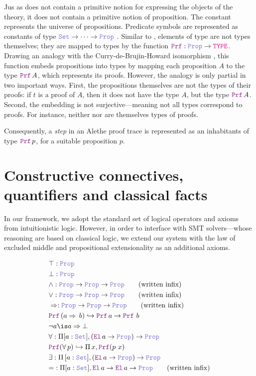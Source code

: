 Jus as \lpm{} does not contain a primitive notion for expressing the objects of the theory, it does not contain a primitive notion of proposition.
The constant \prop{} represents the universe of propositions. Predicate symbols are represented as constants of type $\set{} \ra \dots \ra \prop$ .
Similar to \set{}, elements of type \prop{} are not types themselves; they are mapped to types by the function $\prf{}: \prop \rightarrow \type$.
Drawing an analogy with the Curry-de-Brujin-Howard isomorphism \cite{curryhoward}, this function embeds propositions into types by mapping each proposition $A$ to the type $\prf\,A$, which represents its proofs.
However, the analogy is only partial in two important ways. First, the propositions themselves are not the types of their proofs: if $t$ is a proof of $A$, then it does not have the type $A$,
but the type $\prf\,A$. Second, the embedding is not surjective—meaning not all types correspond to proofs. For instance, neither \set{} nor \prop{} are themselves types of proofs. 

Consequently, a \emph{step} in an Alethe proof trace is represented as an inhabitants of type $\prf{}\,p$, for a suitable proposition $p$.

\section{Constructive connectives, quantifiers and classical facts}
\label{ssec:encoding-prop}

In our framework, we adopt the standard set of logical operators and axioms from intuitionistic logic.
However, in order to interface with SMT solvers—whose reasoning are based on classical logic, we extend our system with the law of excluded middle and propositional extensionality as an additional axioms.

\begin{definition}
\begin{align}
& \top : \prop \\
& \bot : \prop \\
& \land : \prop \ra \prop \ra \prop \qquad \text{(written inﬁx)} \\
& \lor : \prop \ra \prop \ra \prop \qquad \text{(written inﬁx)} \\
& \Rightarrow : \prop \ra \prop \ra \prop \qquad \text{(written inﬁx)} \\
&  \prf\,(a \Rightarrow\,b) \re \prf\, a \ra \prf\,\,b \label{eq:imp}\\
& \neg a \is a \Rightarrow \bot \\
& \forall : \Pi {[a: \set]}, (\el\, a \ra \prop) \ra \prop \label{eq:forall}\\
& \prf{}(\forall\,p) \re \Pi\, x, \prf{(p~x)}\\
& \exists : \Pi\, {[a: \set]}, (\el\, a \ra \prop) \ra \prop \\
& {=} : \Pi [a : \set], \el\, a \ra \el\, a \ra \prop \qquad \text{(written inﬁx)}
\end{align}
\end{definition}

